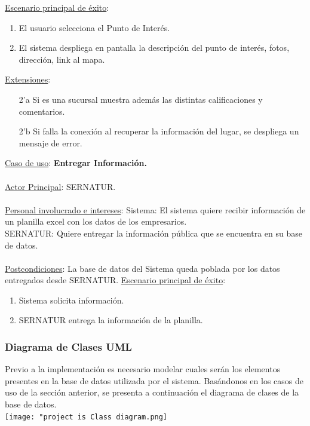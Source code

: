 \documentclass[12pt]{article}
\begin{document}
\underline{Escenario principal de éxito}:
\begin{enumerate}
\item El usuario selecciona el Punto de Interés.
\item El sistema despliega en pantalla la descripción del punto de interés, fotos, dirección, link al mapa.
\end{enumerate}
\underline{Extensiones}:
\begin{enumerate}
\item[2'a] Si es una sucursal muestra además las distintas calificaciones y comentarios.
\item[2'b] Si falla la conexión al recuperar la información del lugar, se despliega un mensaje de error.
\end{enumerate}
\underline{Caso de uso}: \textbf{Entregar Información.}\\\\
\underline{Actor Principal}: SERNATUR.\\\\
\underline{Personal involucrado e intereses}: Sistema: El sistema quiere recibir información de un planilla excel con los datos de los empresarios.\\
SERNATUR: Quiere entregar la información pública que se encuentra en su base de datos.\\\\
\underline{Postcondiciones}: La base de datos del Sistema queda poblada por los datos entregados desde SERNATUR.
\underline{Escenario principal de éxito}:
\begin{enumerate}
\item Sistema solicita información.
\item SERNATUR entrega la información de la planilla.
\end{enumerate}
\subsubsection{Diagrama de Clases UML}
Previo a la implementación es necesario modelar cuales serán los elementos presentes en la base de datos utilizada por el sistema. Basándonos en los casos de uso de la sección anterior, se presenta a continuación el diagrama de clases de la base de datos.\\
\texttt{[image: "project is Class diagram.png]}
\end{document}
